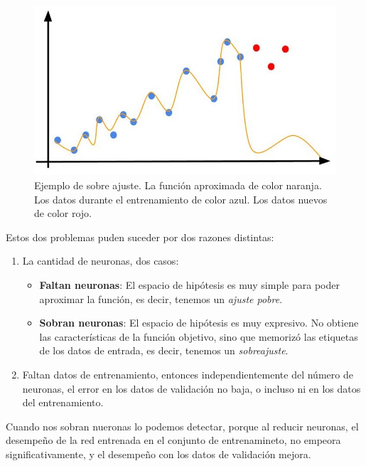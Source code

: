 \begin{description}
  \begin{figure}[H]
   \centering
   \includegraphics[scale=0.5]{../Figuras/overfitting.jpg}
   \caption{Ejemplo de sobre ajuste. La función aproximada de color naranja. Los datos durante el entrenamiento de color azul. Los datos nuevos de color rojo.}
  \label{fig:overF}
  \end{figure}
 \end{description}

Estos dos problemas puden suceder por dos razones distintas:
\begin{enumerate}
 \item La cantidad de neuronas, dos casos:
    \begin{itemize}
     \item \textbf{Faltan neuronas}: El espacio de hipótesis es muy simple para poder aproximar la función, es decir, tenemos un \textit{ajuste pobre}.
    
    \item \textbf{Sobran neuronas}: El espacio de hipótesis es muy expresivo. No obtiene las características de la función objetivo, sino que memorizó las etiquetas de los datos de entrada, es decir, tenemos un \textit{sobreajuste}.
    \end{itemize}

 \item Faltan datos de entrenamiento, entonces independientemente del número de neuronas, el error en los datos de validación no baja, o incluso ni en los datos del entrenamiento.
\end{enumerate}

Cuando nos sobran nueronas lo podemos detectar, porque al reducir neuronas, el desempeño de la red entrenada en el conjunto de entrenamineto, no empeora significativamente, y el desempeño con los datos de validación mejora.

